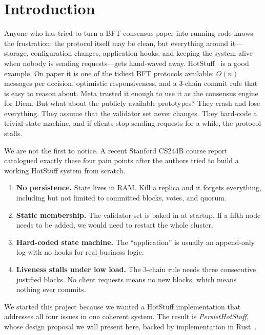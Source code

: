 \chapter{Introduction}
\label{sec:introduction}

Anyone who has tried to turn a BFT consensus paper into running code knows the frustration:
the protocol itself may be clean, but everything around it---storage, configuration changes,
application hooks, and keeping the system alive when nobody is sending requests---gets
hand-waved away.  HotStuff~\cite{hotstuff2019} is a good example.  On paper it is one of
the tidiest BFT protocols available: $O(n)$ messages per decision, optimistic
responsiveness, and a 3-chain commit rule that is easy to reason about.  Meta trusted it
enough to use it as the consensus engine for Diem.  But what about the publicly available
prototypes?  They crash and lose everything.  They assume that the validator set never
changes.  They hard-code a trivial state machine, and if clients stop sending requests for a
while, the protocol stalls.

We are not the first to notice.  A recent Stanford CS244B course
report~\cite{stanford_hotstuff2024} catalogued exactly these four pain points after the
authors tried to build a working HotStuff system from scratch.

\begin{enumerate}
  \item \textbf{No persistence.}  State lives in RAM.  Kill a replica and it forgets
    everything, including but not limited to committed blocks, votes, and quorum.
  \item \textbf{Static membership.}  The validator set is baked in at startup.  If a fifth
    node needs to be added, we would need to restart the whole cluster.
  \item \textbf{Hard-coded state machine.}  The ``application'' is usually an append-only
    log with no hooks for real business logic.
  \item \textbf{Liveness stalls under low load.}  The 3-chain rule needs three consecutive
    justified blocks.  No client requests means no new blocks, which means nothing ever
    commits.
\end{enumerate}

We started this project because we wanted a HotStuff implementation that addresses all four
issues in one coherent system.  The result is \textit{PersistHotStuff}, whose design
proposal we will present here, backed by implementation in Rust~\cite{rust-implementation}.

